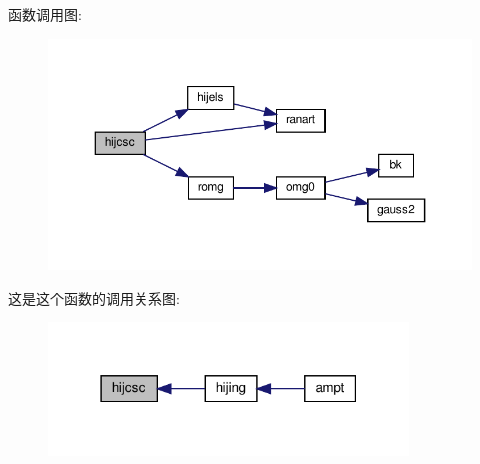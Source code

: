 函数调用图\+:
\nopagebreak
\begin{figure}[H]
\begin{center}
\leavevmode
\includegraphics[width=350pt]{hijcsc_8f90_a9ea79faaa7a824d3f7c85d8a4c7c27f0_cgraph}
\end{center}
\end{figure}
这是这个函数的调用关系图\+:
\nopagebreak
\begin{figure}[H]
\begin{center}
\leavevmode
\includegraphics[width=271pt]{hijcsc_8f90_a9ea79faaa7a824d3f7c85d8a4c7c27f0_icgraph}
\end{center}
\end{figure}
